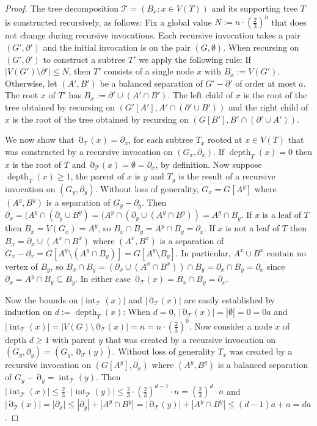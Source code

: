 \documentclass{patmorin}
\DeclareMathOperator{\depth}{depth}
\DeclareMathOperator{\interior}{int}
\DeclareMathOperator{\boundary}{\partial}
\begin{document}
\begin{proof}
  The tree decomposition $\mathcal{T}=(B_x:x\in V(T))$ and its supporting tree $T$ is constructed recursively, as follows:  Fix a global value $N:=n\cdot(\tfrac{2}{3})^h$ that does not change during recursive invocations. Each recursive invocation takes a pair $(G',\partial')$ and the initial invocation is on the pair $(G,\emptyset)$. When recursing on $(G',\partial')$ to construct a subtree $T'$ we apply the following rule:  If $|V(G')\setminus\partial'|\le N$, then $T'$ consists of a single node $x$ with $B_{x}:=V(G')$.  Otherwise, let $(A',B')$ be a balanced separation of $G'-\partial'$ of order at most $a$.  The root $x$ of $T'$ has $B_{x}:=\partial'\cup (A'\cap B')$. The left child of $x$ is the root of the tree obtained by recursing on $(G'[A'],A'\cap(\partial'\cup B'))$ and the right child of $x$ is the root of the tree obtained by recursing on $(G[B'],B'\cap(\partial'\cup A'))$.

  We now show that $\boundary_{\mathcal{T}}(x)=\partial_x$, for each subtree $T_x$ rooted at $x\in V(T)$ that was constructed by a recursive invocation on $(G_x,\partial_x)$. If $\depth_T(x)=0$ then $x$ is the root of $T$ and $\boundary_{\mathcal{T}}(x)=\emptyset=\partial_x$, by definition.
  Now suppose $\depth_T(x)\ge 1$, the parent of $x$ is $y$ and $T_y$ is the result of a recursive invocation on $(G_y,\partial_y)$.
  Without loss of generality, $G_x=G[A^y]$ where $(A^y,B^y)$ is a separation of $G_y-\partial_y$.  Then $\partial_x=(A^y\cap(\partial_y\cup B^y)=(A^y\cap (\partial_y\cup (A^y\cap B^y))=A^y\cap B_y$.  If $x$ is a leaf of $T$ then $B_x=V(G_x)=A^y$, so $B_x\cap B_y=A^y\cap B_y=\partial_x$.  If $x$ is not a leaf of $T$ then $B_x=\partial_x\cup (A^x\cap B^x)$ where $(A^x,B^x)$ is a separation of $G_x-\partial_x=G[A^y\setminus (A^y\cap B_y)]=G[A^y\setminus B_y]$. In particular, $A^x\cup B^x$ contain no vertex of $B_y$, so $B_x\cap B_y=(\partial_x\cup (A^x\cap B^x))\cap B_y= \partial_x\cap B_y=\partial_x$ since $\partial_x=A^y\cap B_y\subseteq B_y$.  In either case $\boundary_{\mathcal{T}}(x)=B_x\cap B_y=\partial_x$.


  Now the bounds on $|\interior_{\mathcal{T}}(x)|$ and $|\boundary_{\mathcal{T}}(x)|$ are easily established by induction on $d:=\depth_T(x)$: When $d=0$, $|\boundary_{\mathcal{T}}(x)|=|\emptyset|=0 = 0a$ and $|\interior_{\mathcal{T}}(x)|=|V(G)\setminus\boundary_{\mathcal{T}}(x)|=n=n\cdot (\tfrac{2}{3})^0$. Now consider a node $x$ of depth $d\ge 1$ with parent $y$ that was created by a recursive invocation on $(G_y,\partial_y)=(G_y,\boundary_\mathcal{T}(y))$. Without loss of generality $T_x$ was created by a recursive invocation on $(G[A^y],\partial_x)$ where $(A^y,B^y)$ is a balanced separation of $G_y-\boundary_y=\interior_{\mathcal{T}}(y)$. Then  $|\interior_{\mathcal{T}}(x)|\le \tfrac{2}{3}\cdot |\interior_{\mathcal{T}}(y)|\le \tfrac{2}{3}\cdot (\frac{2}{3})^{d-1}\cdot n=(\tfrac{2}{3})^d\cdot n$ and $|\boundary_{\mathcal{T}}(x)|=|\partial_x|\le |\partial_y|+|A^y\cap B^y|= |\boundary_{\mathcal{T}}(y)|+|A^y\cap B^y|\le (d-1)a + a=da$.


\end{proof}
\end{document}
